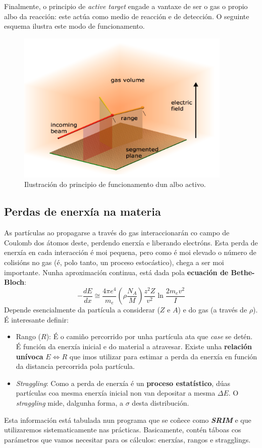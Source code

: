 \documentclass[11pt, a4paper]{article}
\begin{document}
Finalmente, o principio de \textit{active target} engade a vantaxe de ser o gas o propio albo da reacción: este actúa como medio de reacción e de detección. O seguinte esquema ilustra este modo de funcionamento.
\begin{figure}[!htp]
    \centering
    \includegraphics[width=0.35\linewidth]{figures/tpc.png}
    \caption{Ilustración do principio de funcionamento dun albo activo.}
\end{figure}

\subsection{Perdas de enerxía na materia}
As partículas ao propagarse a través do gas interaccionarán co campo de Coulomb dos átomos deste, perdendo enerxía e liberando electróns. Esta perda de enerxía en cada interacción é moi pequena, pero como é moi elevado o número de colisións no gas (é, polo tanto, un proceso estocástico), chega a ser moi importante. Nunha aproximación continua, está dada pola \textbf{ecuación de Bethe-Bloch}:
\begin{equation*}\label{eq:stopping}
    - \frac{dE}{dx} \cong \frac{4 \pi e^4}{m_e} \left(\rho \frac{N_A}{M}\right)\frac{z^2 Z}{v^2} \ln{\frac{2m_e v^2}{I}}
\end{equation*}
Depende esencialmente da partícula a considerar ($Z$ e $A$) e do gas (a través de $\rho$). É interesante definir:
\begin{itemize}
    \item Rango ($R$): É o camiño percorrido por unha partícula ata que \textit{case} se detén. É función da enerxía inicial e do material a atravesar. Existe unha \textbf{relación unívoca} $E \Longleftrightarrow R$ que imos utilizar para estimar a perda da enerxía en función da distancia percorrida pola partícula.
    \item \textit{Straggling}: Como a perda de enerxía é un \textbf{proceso estatístico}, dúas partículas coa mesma enerxía inicial non van depositar a mesma $\Delta E$. O \textit{straggling} mide, dalgunha forma, a $\sigma$ desta distribución.
\end{itemize}
Esta información está tabulada nun programa que se coñece como \textit{\textbf{SRIM}} e que utilizaremos sistematicamente nas prácticas. Basicamente, contén táboas cos parámetros que vamos necesitar para os cálculos: enerxías, rangos e stragglings.
\end{document}
